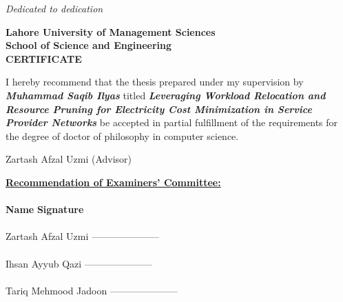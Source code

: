 \newpage
\thispagestyle{empty}
\begin{center}
 \vspace*{3in}
  \textit{\LARGE {Dedicated to dedication}}\\

\end{center}

\newpage
\thispagestyle{empty}
\begin{center}
  \vspace*{1cm}
\textbf{\Large Lahore University of Management Sciences}\\
\vspace*{1cm} \textbf{\large School of Science and
Engineering}\\\vspace*{1cm} \textbf{\large CERTIFICATE}
\end{center}
\vspace*{1cm}I hereby recommend that the thesis prepared under my
supervision by \textbf{\textit{Muhammad Saqib Ilyas}} titled
\textbf{\textit{Leveraging Workload Relocation and Resource Pruning for Electricity Cost Minimization in Service Provider Networks}} be accepted in partial fulfillment of the requirements for the degree of doctor of philosophy in computer science.\vspace{1in}
\begin{flushright}
Zartash Afzal Uzmi (Advisor) \end{flushright}
\textbf{\underline{Recommendation of Examiners' Committee:}}\\
\\\textbf{Name} \hspace*{5.5cm} \textbf{Signature}\\ \\
Zartash Afzal Uzmi \hspace*{2.7cm} {---------------------}\\\\
Ihsan Ayyub Qazi \hspace*{3.0cm} {---------------------}\\\\
Tariq Mehmood Jadoon\hspace*{2.1cm} {---------------------}

